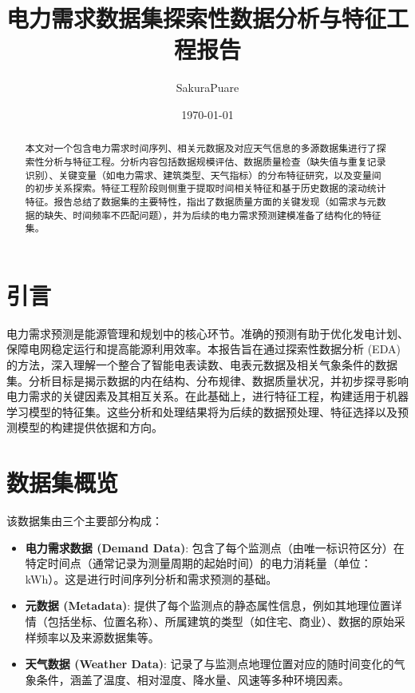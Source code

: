 \documentclass{article} %
\title{电力需求数据集探索性数据分析与特征工程报告}
\author{SakuraPuare}
\date{\today} %
\begin{document}
\maketitle %

\begin{abstract}
本文对一个包含电力需求时间序列、相关元数据及对应天气信息的多源数据集进行了探索性分析与特征工程。分析内容包括数据规模评估、数据质量检查（缺失值与重复记录识别）、关键变量（如电力需求、建筑类型、天气指标）的分布特征研究，以及变量间的初步关系探索。特征工程阶段则侧重于提取时间相关特征和基于历史数据的滚动统计特征。报告总结了数据集的主要特性，指出了数据质量方面的关键发现（如需求与元数据的缺失、时间频率不匹配问题），并为后续的电力需求预测建模准备了结构化的特征集。
\end{abstract}

\newpage

\tableofcontents

\newpage

\section{引言}
\label{sec:introduction}

电力需求预测是能源管理和规划中的核心环节。准确的预测有助于优化发电计划、保障电网稳定运行和提高能源利用效率。本报告旨在通过探索性数据分析 (EDA) 的方法，深入理解一个整合了智能电表读数、电表元数据及相关气象条件的数据集。分析目标是揭示数据的内在结构、分布规律、数据质量状况，并初步探寻影响电力需求的关键因素及其相互关系。在此基础上，进行特征工程，构建适用于机器学习模型的特征集。这些分析和处理结果将为后续的数据预处理、特征选择以及预测模型的构建提供依据和方向。

\section{数据集概览}
\label{sec:dataset_overview}

该数据集由三个主要部分构成：
\begin{itemize}
    \item \textbf{电力需求数据 (Demand Data)}: 包含了每个监测点（由唯一标识符区分）在特定时间点（通常记录为测量周期的起始时间）的电力消耗量（单位：kWh）。这是进行时间序列分析和需求预测的基础。
    \item \textbf{元数据 (Metadata)}: 提供了每个监测点的静态属性信息，例如其地理位置详情（包括坐标、位置名称）、所属建筑的类型（如住宅、商业）、数据的原始采样频率以及来源数据集等。
    \item \textbf{天气数据 (Weather Data)}: 记录了与监测点地理位置对应的随时间变化的气象条件，涵盖了温度、相对湿度、降水量、风速等多种环境因素。
\end{itemize}
\end{document}
